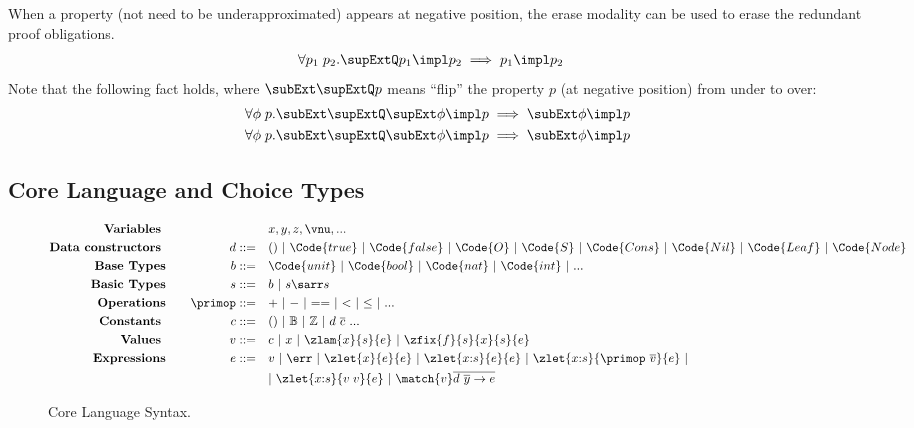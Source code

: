 When a property (not need to be underapproximated) appears at negative position, the erase modality can be used to erase the redundant proof obligations.
\begin{align*}
  &\forall p_1\;p_2.  \supExtQ p_1 \impl p_2 \implies p_1 \impl p_2
\end{align*}\noindent
Note that the following fact holds, where $\subExt \supExtQ p $ means ``flip'' the property $p$ (at negative position) from under to over:
\begin{align*}
  &\forall \phi\;p.  \subExt \supExtQ \supExt \phi \impl p \implies \subExt \phi \impl p
  \\&\forall \phi\;p. \subExt \supExtQ \subExt \phi \impl p \implies \subExt \phi \impl p
\end{align*}

\subsection{Core Language and Choice Types}

\begin{figure}[h]
{\small
  \begin{alignat*}{2}
    \text{\textbf{Variables }}& \quad &\quad& x, y, z, \vnu, ...
    \\\text{\textbf{Data constructors }}& \quad &d ::= \quad & () ~|~ \Code{true} ~|~ \Code{false} ~|~ \Code{O} ~|~ \Code{S} ~|~ \Code{Cons} ~|~ \Code{Nil} ~|~ \Code{Leaf} ~|~ \Code{Node}
    \\\text{\textbf{Base Types}}& \quad & b  ::= \quad &  \Code{unit} ~|~ \Code{bool} ~|~ \Code{nat} ~|~ \Code{int} ~|~ ...
    \\\text{\textbf{Basic Types}}& \quad & s  ::= \quad &  b ~|~ s\sarr s
    \\\text{\textbf{Operations}}& \quad & \primop ::= \quad & {+} ~|~ {-} ~|~ {==} ~|~ {<} ~|~ {\leq} ~|~ ...
    \\ \text{\textbf{Constants }}& \quad &c ::= \quad & () ~|~ \mathbb{B} ~|~ \mathbb{Z} ~|~ d\ \overline{c}\ ...
    \\ \text{\textbf{Values }}& \quad  & v ::= \quad & c ~|~ x ~|~ \zlam{x}{s}{e} ~|~ \zfix{f}{s}{x}{s}{e}
    \\ \text{\textbf{Expressions}}& \quad & e ::=\quad & v ~|~ \err ~|~ \zlet{x}{e}{e} ~|~ \zlet{x{:}s}{e}{e} ~|~ \zlet{x{:}s}{\primop\ \overline{v}}{e} ~|~ 
    \\ & & \quad & |~  \zlet{x{:}s}{v\;v}{e} ~|~ \match{v} \overline{d\ \overline{y} \to e} 
  \end{alignat*}}
\caption{Core Language Syntax. }
\label{fig:core-lang-syntax}
\end{figure}

